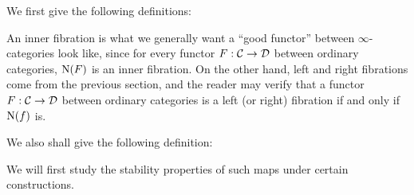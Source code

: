 \label{secg}

We first give the following definitions:


An inner fibration is what we generally want a ``good functor'' between $\infty$-categories look like, since for every functor $F:\mathcal{C}\to\mathcal{D}$
between ordinary categories, $\mathrm{N}(F)$ is an inner fibration. On the other hand, left and right fibrations come from the previous section,
and the reader may verify that a functor $F:\mathcal{C}\to\mathcal{D}$ between ordinary categories is a left (or right) fibration if and only if
$\mathrm{N}(f)$ is.

We also shall give the following definition:


We will first study the stability properties of such maps under certain constructions.
